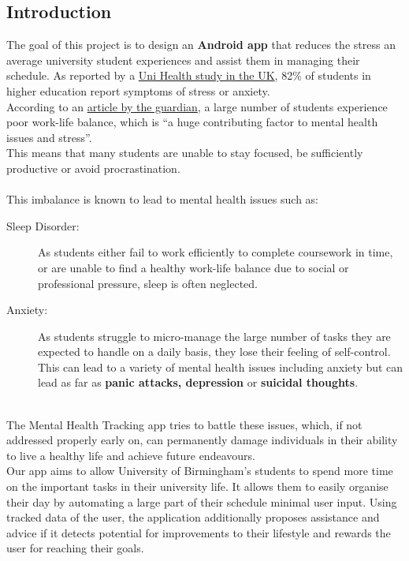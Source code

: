 \documentclass[a4paper,11pt]{article} %
\begin{document}
\subsection{Introduction}
The goal of this project is to design an \textbf{Android app} that reduces the stress an average university
student experiences and assist them in managing their schedule.\hfill
As reported by a \href{https://www.thenationalstudent.com/Student/2017-08-31/82_of_students_suffer_from_stress_and_anxiety.html}{Uni Health study in the UK}, 82\% of students in higher 
education report symptoms of stress or anxiety.\\
According to an \href{https://www.theguardian.com/education/2019/may/31/why-are-students-at-university-so-stressed}{article by the guardian}, a large number of students 
experience poor work-life balance, which is ``a huge contributing factor to mental health issues and stress''.\\
This means that many students are unable to stay focused, be sufficiently productive 
or avoid procrastination. \\
\\
This imbalance is known to lead to mental health issues such as:
\begin{description}
    \item[Sleep Disorder:] As students either fail to work efficiently to complete coursework 
    in time, or are unable to find a healthy work-life balance due to social or professional 
    pressure, sleep is often neglected.
    \item[Anxiety:] As students struggle to micro-manage the large number of tasks they are 
    expected to handle on a daily basis, they lose their feeling of self-control. This can 
    lead to a variety of mental health issues including anxiety but can lead as far 
    as \textbf{panic attacks, depression} or \textbf{suicidal thoughts}.
\end{description}
\ \\
The Mental Health Tracking app tries to battle these issues, which, if not addressed properly early on, 
can permanently damage individuals in their ability to live a healthy life and achieve future endeavours.\\

Our app aims to allow University of Birmingham’s students to spend more time on the important tasks in 
their university life. It allows them to easily organise their day by automating a large part of their 
schedule minimal user input.  
Using tracked data of the user, the application additionally proposes assistance and advice if it 
detects potential for improvements to their lifestyle and rewards the user for reaching their goals. 
\end{document}
